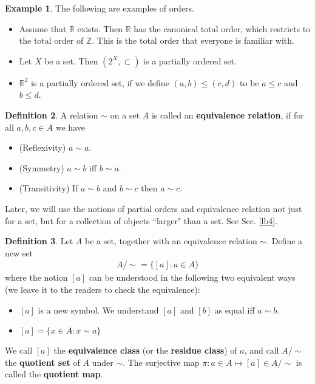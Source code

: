 \documentclass[12pt,b5paper,notitlepage]{article}
\theoremstyle{definition}
\newtheorem{df}{Definition}[section]
\newtheorem{eg}[df]{Example}
\theoremstyle{plain}
\newcommand{\Zbb}{\mathbb Z}
\newcommand{\Rbb}{\mathbb R}
\numberwithin{equation}{section}
\begin{document}
\begin{eg}
The following are examples of orders.
\begin{itemize}
\item Assume that $\Rbb$ exists. Then $\Rbb$ has the canonical total order, which restricts to the total order of $\Zbb$. This is the total order that everyone is familiar with.
\item Let $X$ be a set. Then $(2^X,\subset)$ is a partially ordered set.
\item $\Rbb^2$ is a partially ordered set, if we define $(a,b)\leq (c,d)$ to be $a\leq c$ and $b\leq d$. 
\end{itemize}
\end{eg}


\begin{df}
A relation $\sim$ on a set $A$ is called an \textbf{equivalence relation}, if for all $a,b,c\in A$ we have
\begin{itemize}
\item (Reflexivity) $a\sim a$.
\item (Symmetry) $a\sim b$ iff $b\sim a$.
\item (Transitivity) If $a\sim b$ and $b\sim c$ then $a\sim c$.
\end{itemize}
\end{df}

Later, we will use the notions of partial orders and equivalence relation not just for a set, but for a collection of objects ``larger" than a set. See Sec. \ref{lb4}.

\begin{df}
Let $A$ be a set, together with an equivalence relation $\sim$. Define a new set
\begin{align*}
{A/\sim}=\{[a]: a\in A\}
\end{align*}
where the notion $[a]$ can be understood in the following two equivalent ways (we leave it to the readers to check the equivalence):
\begin{itemize}
\item[(1)] $[a]$ is a new symbol. We understand $[a]$ and $[b]$ as equal iff $a\sim b$.
\item[(2)] $[a]=\{x\in A: x\sim a \}$
\end{itemize}
We call $[a]$ the \textbf{equivalence class} (or the \textbf{residue class}) of $a$, and call $A/\sim$ the \textbf{quotient set}  of $A$ under $\sim$. The surjective map $\pi:a\in A\mapsto [a]\in {A/\sim}$ is called the \textbf{quotient map}.
\end{df}
\end{document}
